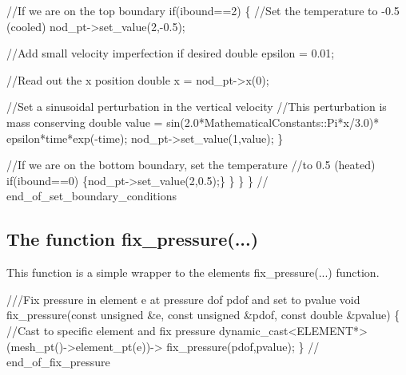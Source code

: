 \begin{DoxyCodeInclude}
     \textcolor{comment}{//If we are on the top boundary}
     \textcolor{keywordflow}{if}(ibound==2) 
      \{
       \textcolor{comment}{//Set the temperature to -0.5 (cooled)}
       nod\_pt->set\_value(2,-0.5);

       \textcolor{comment}{//Add small velocity imperfection if desired}
       \textcolor{keywordtype}{double} epsilon = 0.01;

       \textcolor{comment}{//Read out the x position}
       \textcolor{keywordtype}{double} x = nod\_pt->x(0);

       \textcolor{comment}{//Set a sinusoidal perturbation in the vertical velocity}
       \textcolor{comment}{//This perturbation is mass conserving}
       \textcolor{keywordtype}{double} value = sin(2.0*MathematicalConstants::Pi*x/3.0)*
        epsilon*time*exp(-time);
       nod\_pt->set\_value(1,value);
      \}

     \textcolor{comment}{//If we are on the bottom boundary, set the temperature}
     \textcolor{comment}{//to 0.5 (heated)}
     \textcolor{keywordflow}{if}(ibound==0) \{nod\_pt->set\_value(2,0.5);\}
    \}
  \}
\} \textcolor{comment}{// end\_of\_set\_boundary\_conditions}

\end{DoxyCodeInclude}




 

\hypertarget{index_fix_p}{}\subsection{The function fix\+\_\+pressure(...)}\label{index_fix_p}
This function is a simple wrapper to the element\textquotesingle{}s {\ttfamily fix\+\_\+pressure}(...) function.

 
\begin{DoxyCodeInclude}
 \textcolor{comment}{///Fix pressure in element e at pressure dof pdof and set to pvalue}
 \textcolor{keywordtype}{void} fix\_pressure(\textcolor{keyword}{const} \textcolor{keywordtype}{unsigned} &e, \textcolor{keyword}{const} \textcolor{keywordtype}{unsigned} &pdof, 
                   \textcolor{keyword}{const} \textcolor{keywordtype}{double} &pvalue)
  \{
   \textcolor{comment}{//Cast to specific element and fix pressure}
   \textcolor{keyword}{dynamic\_cast<}ELEMENT*\textcolor{keyword}{>}(mesh\_pt()->element\_pt(e))->
    fix\_pressure(pdof,pvalue);
  \} \textcolor{comment}{// end\_of\_fix\_pressure}

\end{DoxyCodeInclude}




